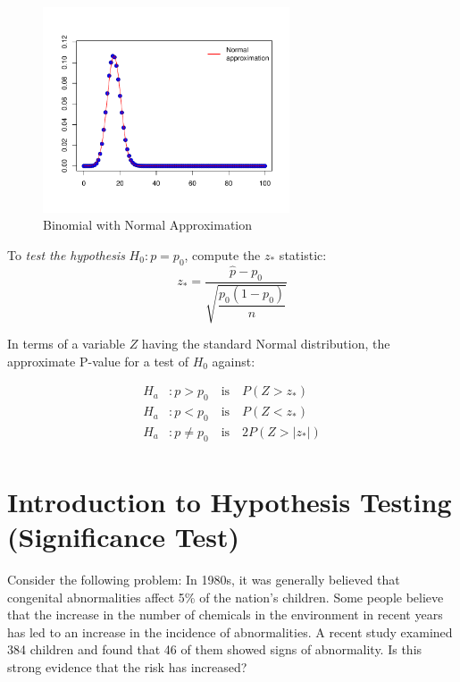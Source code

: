 \begin{figure}[H]
  \centering
  \includegraphics[width=0.65\textwidth]{section11/images/binomial_normal_approximation.pdf}
  \caption{Binomial with Normal Approximation}
\end{figure}
\begin{tcolorbox}[title=\textbf{Hypotheses Tests for a Proportion},
colback=yellow!10,
colframe=black!45,
coltitle=black,
fonttitle=\bfseries,
breakable]

To \textit{test the hypothesis} $H_0 : p = p_0$, compute the $z_\ast$ statistic:
\[
z_\ast = \frac{\hat{p} - p_0}{\sqrt{\dfrac{p_0(1 - p_0)}{n}}}
\]

In terms of a variable $Z$ having the standard Normal distribution, the approximate P-value for a test of $H_0$ against:

\begin{align*}
H_a &: p > p_0 \quad \text{is} \quad P(Z > z_\ast) \\
H_a &: p < p_0 \quad \text{is} \quad P(Z < z_\ast) \\
H_a &: p \ne p_0 \quad \text{is} \quad 2P(Z > |z_\ast|) \\
\end{align*}

\end{tcolorbox}
\section*{Introduction to Hypothesis Testing (Significance Test)}

Consider the following problem: In 1980s, it was generally believed that congenital abnormalities affect 5\% of the nation’s children. Some people believe that the increase in the number of chemicals in the environment in recent years has led to an increase in the incidence of abnormalities. A recent study examined 384 children and found that 46 of them showed signs of abnormality. Is this strong evidence that the risk has increased?

